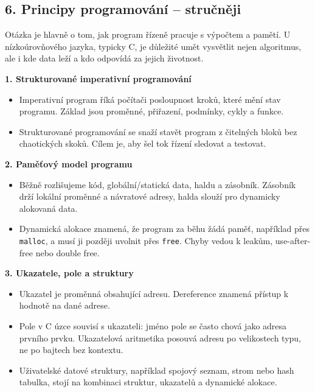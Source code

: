 
\subsection*{6. Principy programování -- stručněji}
Otázka je hlavně o tom, jak program řízeně pracuje s výpočtem a pamětí. U nízkoúrovňového jazyka, typicky C, je důležité umět vysvětlit nejen algoritmus, ale i kde data leží a kdo odpovídá za jejich životnost.

\textbf{1. Strukturované imperativní programování}
\begin{itemize}
  \item Imperativní program říká počítači posloupnost kroků, které mění stav programu. Základ jsou proměnné, přiřazení, podmínky, cykly a funkce.
  \item Strukturované programování se snaží stavět program z čitelných bloků bez chaotických skoků. Cílem je, aby šel tok řízení sledovat a testovat.
\end{itemize}

\textbf{2. Paměťový model programu}
\begin{itemize}
  \item Běžně rozlišujeme kód, globální/statická data, haldu a zásobník. Zásobník drží lokální proměnné a návratové adresy, halda slouží pro dynamicky alokovaná data.
  \item Dynamická alokace znamená, že program za běhu žádá paměť, například přes \texttt{malloc}, a musí ji později uvolnit přes \texttt{free}. Chyby vedou k leakům, use-after-free nebo double free.
\end{itemize}

\textbf{3. Ukazatele, pole a struktury}
\begin{itemize}
  \item Ukazatel je proměnná obsahující adresu. Dereference znamená přístup k hodnotě na dané adrese.
  \item Pole v C úzce souvisí s ukazateli: jméno pole se často chová jako adresa prvního prvku. Ukazatelová aritmetika posouvá adresu po velikostech typu, ne po bajtech bez kontextu.
  \item Uživatelské datové struktury, například spojový seznam, strom nebo hash tabulka, stojí na kombinaci struktur, ukazatelů a dynamické alokace.
\end{itemize}

